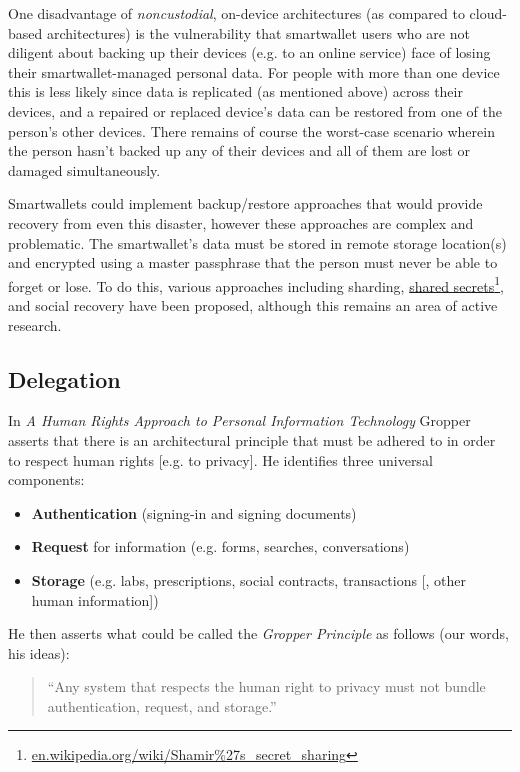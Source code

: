 \documentclass[11pt, oneside]{article}   	%
\newcommand{\hyperfootnote}[1][]{\def\ArgI{{#1}}\hyperfootnoteRelay}
\newcommand\hyperfootnoteRelay[2][]{\href{#1#2}{\ArgI}\footnote{\href{#1#2}{#2}}}
\begin{document}
One disadvantage of \emph{noncustodial}, on-device architectures (as compared to cloud-based architectures) is the vulnerability that smartwallet users who are not diligent about backing up their devices (e.g. to an online service) face of losing their smartwallet-managed personal data. For people with more than one device this is less likely since data is replicated (as mentioned above) across their devices, and a repaired or replaced device's data can be restored from one of the person's other devices. There remains of course the worst-case scenario wherein the person hasn't backed up any of their devices and all of them are lost or damaged simultaneously. 

Smartwallets could implement backup/restore approaches that would provide recovery from even this disaster, however these approaches are complex and problematic. The smartwallet's data must be stored in remote storage location(s) and encrypted using a master passphrase that the person must never be able to forget or lose. To do this, various approaches including sharding, \hyperfootnote[shared secrets][https://]{en.wikipedia.org/wiki/Shamir\%27s\_secret\_sharing}, and social recovery have been proposed, although this remains an area of active research. 

\subsection{Delegation}

In \emph{A Human Rights Approach to Personal Information Technology}\cite{Gropper2022} Gropper asserts that there is an architectural principle that must be adhered to in order to respect human rights [e.g. to privacy]. He identifies three universal components:

\begin{itemize}
\item \textbf{Authentication} (signing-in and signing documents)
\item \textbf{Request} for information (e.g. forms, searches, conversations)
\item \textbf{Storage} (e.g. labs, prescriptions, social contracts, transactions [, other human information])
\end{itemize}

He then asserts what could be called the \emph{Gropper Principle} as follows (our words, his ideas):
\begin{quote}
``Any system that respects the human right to privacy must not bundle authentication, request, and storage.''
\end{quote}
\end{document}
